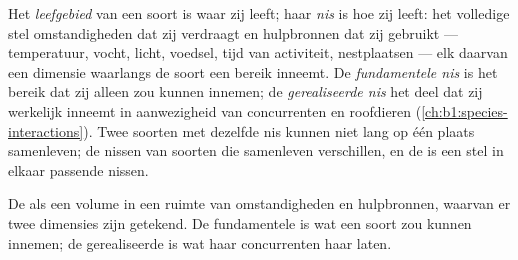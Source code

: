 \begin{definition}\label{def:b1:ecosystem-organization:niche}
Het \emph{leefgebied} van een soort is waar zij leeft; haar \emph{nis} is
hoe zij leeft: het volledige stel omstandigheden dat zij verdraagt en
hulpbronnen dat zij gebruikt --- temperatuur, vocht, licht, voedsel, tijd
van activiteit, nestplaatsen --- elk daarvan een dimensie waarlangs de soort
een bereik inneemt. De \emph{fundamentele nis} is het bereik dat zij alleen
zou kunnen innemen; de \emph{gerealiseerde nis} het deel dat zij werkelijk
inneemt in aanwezigheid van concurrenten en roofdieren
(\cref{ch:b1:species-interactions}). Twee soorten met dezelfde nis kunnen
niet lang op één plaats samenleven; de nissen van soorten die samenleven
verschillen, en de  is een stel in elkaar passende nissen.
\end{definition}

\begin{omfigure}

{\small De  als een volume in een ruimte van omstandigheden en
hulpbronnen, waarvan er twee dimensies zijn getekend. De fundamentele  is
wat een soort zou kunnen innemen; de gerealiseerde  is wat haar
concurrenten haar laten.}
\end{omfigure}

